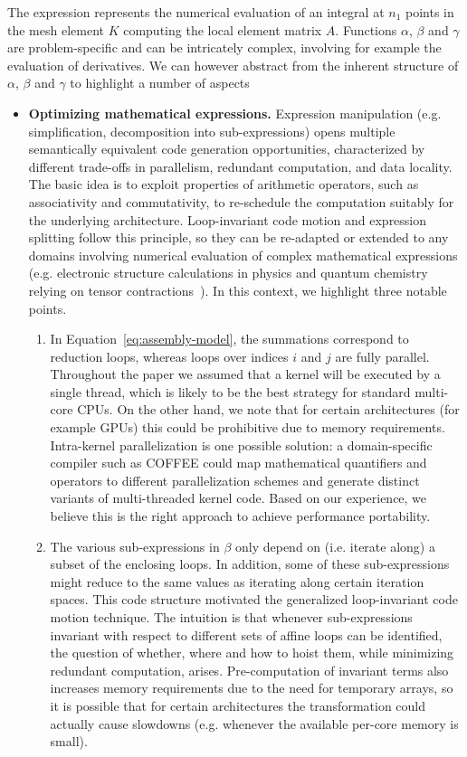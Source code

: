 The expression represents the numerical evaluation of an integral at $n_1$ points in the mesh element $K$ computing the local element matrix $A$. Functions $\alpha$, $\beta$ and $\gamma$ are problem-specific and can be intricately complex, involving for example the evaluation of derivatives. We can however abstract from the inherent structure of $\alpha$, $\beta$ and $\gamma$ to highlight a number of aspects

\begin{itemize}
\item \textbf{Optimizing mathematical expressions.} Expression manipulation (e.g. simplification, decomposition into sub-expressions) opens multiple semantically equivalent code generation opportunities, characterized by different trade-offs in parallelism, redundant computation, and data locality. The basic idea is to exploit properties of arithmetic operators, such as associativity and commutativity, to re-schedule the computation suitably for the underlying architecture. Loop-invariant code motion and expression splitting follow this principle, so they can be re-adapted or extended to any domains involving numerical evaluation of complex mathematical expressions (e.g. electronic structure calculations in physics and quantum chemistry relying on tensor contractions~\cite{TCE}). In this context, we highlight three notable points.
\begin{enumerate}
\item In Equation~\eqref{eq:assembly-model}, the summations correspond to reduction loops, whereas loops over indices $i$ and $j$ are fully parallel. Throughout the paper we assumed that a kernel will be executed by a single thread, which is likely to be the best strategy for standard multi-core CPUs. On the other hand, we note that for certain architectures (for example GPUs) this could be prohibitive due to memory requirements. Intra-kernel parallelization is one possible solution: a domain-specific compiler such as COFFEE could map mathematical quantifiers and operators to different parallelization schemes and generate distinct variants of multi-threaded kernel code. Based on our experience, we believe this is the right approach to achieve performance portability.
\item The various sub-expressions in $\beta$ only depend on (i.e. iterate along) a subset of the enclosing loops. In addition, some of these sub-expressions might reduce to the same values as iterating along certain iteration spaces. This code structure motivated the generalized loop-invariant code motion technique. The intuition is that whenever sub-expressions invariant with respect to different sets of affine loops can be identified, the question of whether, where and how to hoist them, while minimizing redundant computation, arises. Pre-computation of invariant terms also increases memory requirements due to the need for temporary arrays, so it is possible that for certain architectures the transformation could actually cause slowdowns (e.g. whenever the available per-core memory is small).

\end{enumerate}
\end{itemize}
